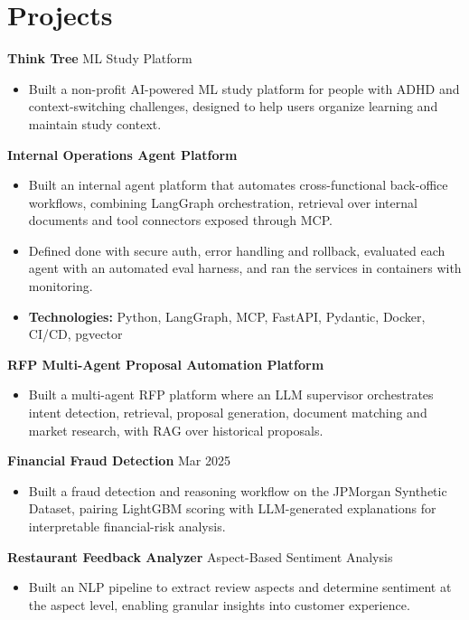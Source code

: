 \documentclass[10pt,a4paper]{article}
\begin{document}
\section{Projects}
\textbf{Think Tree} \textbar{} ML Study Platform\par
\begin{itemize}
  \item Built a non-profit AI-powered ML study platform for people with ADHD and context-switching challenges, designed to help users organize learning and maintain study context.
\end{itemize}
\textbf{Internal Operations Agent Platform}\par
\begin{itemize}
  \item Built an internal agent platform that automates cross-functional back-office workflows, combining LangGraph orchestration, retrieval over internal documents and tool connectors exposed through MCP.
  \item Defined done with secure auth, error handling and rollback, evaluated each agent with an automated eval harness, and ran the services in containers with monitoring.
  \item \textbf{Technologies:} Python, LangGraph, MCP, FastAPI, Pydantic, Docker, CI/CD, pgvector
\end{itemize}
\textbf{RFP Multi-Agent Proposal Automation Platform}\par
\begin{itemize}
  \item Built a multi-agent RFP platform where an LLM supervisor orchestrates intent detection, retrieval, proposal generation, document matching and market research, with RAG over historical proposals.
\end{itemize}
\textbf{Financial Fraud Detection} \textbar{} Mar 2025\par
\begin{itemize}
  \item Built a fraud detection and reasoning workflow on the JPMorgan Synthetic Dataset, pairing LightGBM scoring with LLM-generated explanations for interpretable financial-risk analysis.
\end{itemize}
\textbf{Restaurant Feedback Analyzer} \textbar{} Aspect-Based Sentiment Analysis\par
\begin{itemize}
  \item Built an NLP pipeline to extract review aspects and determine sentiment at the aspect level, enabling granular insights into customer experience.
\end{itemize}
\end{document}
